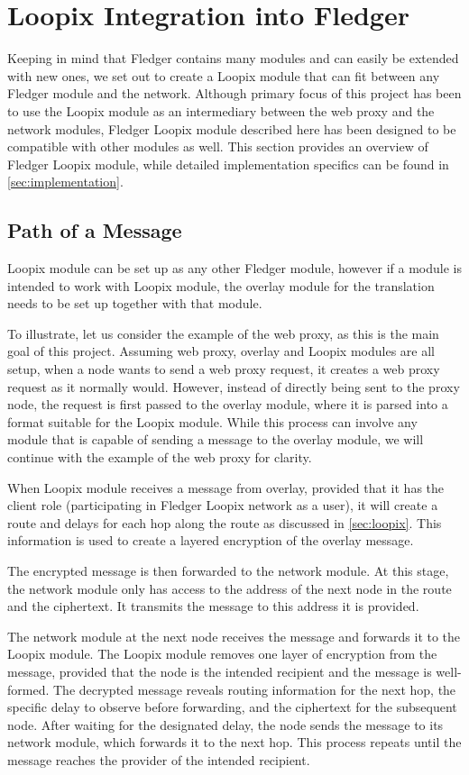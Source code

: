 \documentclass[a4paper,11pt,oneside]{report}
\begin{document}
\section{Loopix Integration into Fledger}
Keeping in mind that Fledger contains many modules and can easily be extended with new ones, we set out to create a Loopix module that can fit between any Fledger module and the network. Although primary focus of this project has been to use the Loopix module as an intermediary between the web proxy and the network modules, Fledger Loopix module described here has been designed to be compatible with other modules as well. This section provides an overview of Fledger Loopix module, while detailed implementation specifics can be found in \autoref{sec:implementation}.

\subsection{Path of a Message}
Loopix module can be set up as any other Fledger module, however if a module is intended to work with Loopix module, the overlay module for the translation needs to be set up together with that module. 
 
To illustrate, let us consider the example of the web proxy, as this is the main goal of this project. Assuming web proxy, overlay and Loopix modules are all setup, when a node wants to send a web proxy request, it creates a web proxy request as it normally would. However, instead of directly being sent to the proxy node, the request is first passed to the overlay module, where it is parsed into a format suitable for the Loopix module. While this process can involve any module that is capable of sending a message to the overlay module, we will continue with the example of the web proxy for clarity.
 
When Loopix module receives a message from overlay, provided that it has the client role (participating in Fledger Loopix network as a user), it will create a route and delays for each hop along the route as discussed in \autoref{sec:loopix}. This information is used to create a layered encryption of the overlay message.

The encrypted message is then forwarded to the network module. At this stage, the network module only has access to the address of the next node in the route and the ciphertext. It transmits the message to this address it is provided.

The network module at the next node receives the message and forwards it to the Loopix module. The Loopix module removes one layer of encryption from the message, provided that the node is the intended recipient and the message is well-formed. The decrypted message reveals routing information for the next hop, the specific delay to observe before forwarding, and the ciphertext for the subsequent node. After waiting for the designated delay, the node sends the message to its network module, which forwards it to the next hop. This process repeats until the message reaches the provider of the intended recipient.
\end{document}

